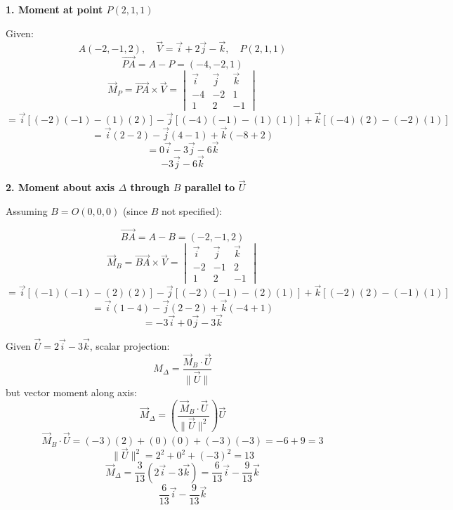 \documentclass[12pt]{article}
\begin{document}
\begin{correctionbox}

\textbf{1. Moment at point \( P(2,1,1) \)}

Given:  
\[
A(-2,-1,2), \quad \vec{V} = \vec{i} + 2\vec{j} - \vec{k}, \quad P(2,1,1)
\]  
\[
\vec{PA} = A - P = (-4, -2, 1)
\]  
\[
\vec{M}_P = \vec{PA} \times \vec{V} = 
\begin{vmatrix}
\vec{i} & \vec{j} & \vec{k} \\
-4 & -2 & 1 \\
1 & 2 & -1
\end{vmatrix}
\]  
\[
= \vec{i}[(-2)(-1) - (1)(2)] - \vec{j}[(-4)(-1) - (1)(1)] + \vec{k}[(-4)(2) - (-2)(1)]
\]  
\[
= \vec{i}(2 - 2) - \vec{j}(4 - 1) + \vec{k}(-8 + 2)
\]  
\[
= 0\vec{i} - 3\vec{j} - 6\vec{k}
\]  
\[
\boxed{-3\vec{j} - 6\vec{k}}
\]

\textbf{2. Moment about axis \( \Delta \) through \( B \) parallel to \( \vec{U} \)}

Assuming \( B = O(0,0,0) \) (since \( B \) not specified):

\[
\vec{BA} = A - B = (-2, -1, 2)
\]  
\[
\vec{M}_B = \vec{BA} \times \vec{V} = 
\begin{vmatrix}
\vec{i} & \vec{j} & \vec{k} \\
-2 & -1 & 2 \\
1 & 2 & -1
\end{vmatrix}
\]  
\[
= \vec{i}[(-1)(-1) - (2)(2)] - \vec{j}[(-2)(-1) - (2)(1)] + \vec{k}[(-2)(2) - (-1)(1)]
\]  
\[
= \vec{i}(1 - 4) - \vec{j}(2 - 2) + \vec{k}(-4 + 1)
\]  
\[
= -3\vec{i} + 0\vec{j} - 3\vec{k}
\]  

Given \( \vec{U} = 2\vec{i} - 3\vec{k} \), scalar projection:
\[
M_\Delta = \frac{\vec{M}_B \cdot \vec{U}}{\|\vec{U}\|}
\]
but vector moment along axis:
\[
\vec{M}_\Delta = \left( \frac{\vec{M}_B \cdot \vec{U}}{\|\vec{U}\|^2} \right) \vec{U}
\]  
\[
\vec{M}_B \cdot \vec{U} = (-3)(2) + (0)(0) + (-3)(-3) = -6 + 9 = 3
\]  
\[
\|\vec{U}\|^2 = 2^2 + 0^2 + (-3)^2 = 13
\]  
\[
\vec{M}_\Delta = \frac{3}{13}(2\vec{i} - 3\vec{k}) = \frac{6}{13}\vec{i} - \frac{9}{13}\vec{k}
\]  
\[
\boxed{\frac{6}{13}\vec{i} - \frac{9}{13}\vec{k}}
\]

\end{correctionbox}

\section{}
\end{document}
